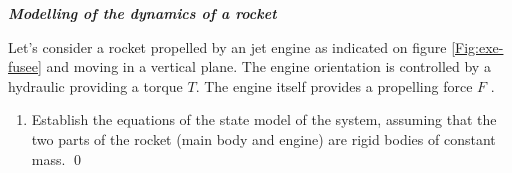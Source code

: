 \begin{exercice}{\bf \em Modelling of the dynamics of a rocket}

Let's consider a rocket propelled by an  jet engine as indicated on figure \ref{Fig:exe-fusee} and moving in a vertical plane. The engine orientation is controlled by a hydraulic  providing a torque $T$. The engine itself provides a propelling force $F$ .
\begin{enumerate}
\item Establish the equations of the state model of the system, assuming that the two parts of the rocket (main body and engine) are rigid bodies of constant mass. \qed
\end{enumerate}
\end{exercice}

